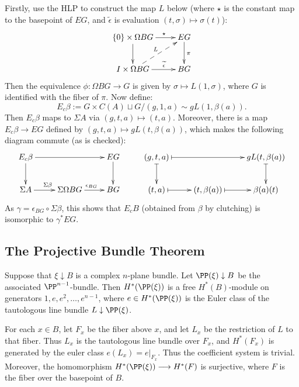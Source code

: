 \documentclass[11pt]{article}
\newcommand{\myheading}[1]
{{\noindent\Large #1}

}
\renewcommand{\myheading}[1]{\subsection{#1}}
\begin{document}
Firstly, use the HLP to construct the map $L$ below (where $\star$ is the constant map to the basepoint of $EG$, and $\widetilde\epsilon$ is evaluation $(t,\sigma)\mapsto \sigma(t)$):
\[\xymatrix{
\{0\}\times\Omega BG\ar[r]^{\ \ \ \ \star}\ar[d]&EG\ar[d]^{\pi}\\
I\times\Omega BG\ar[r]^{\ \ \ \ \widetilde\epsilon}\ar@{-->}[ru]^L&BG
}\]
Then the equivalence $\phi:\Omega BG\to G$ is given by $\sigma\mapsto L(1,\sigma)$, where $G$ is identified with the fiber of $\pi$. Now define:
\[E_c\beta:=G\times C(A)\sqcup G / (g,1,a)\sim gL(1,\beta(a)).\]
Then $E_c\beta$ maps to $\Sigma A$ via $(g,t,a)\mapsto(t,a)$. Moreover, there is a map $E_c\beta\to EG$ defined by $(g,t,a)\mapsto gL(t,\beta(a))$, which makes the following diagram commute (as is checked): 
\[\xymatrix{
E_c\beta\ar[rr]\ar[d]&&EG\ar[d]&
(g,t,a)\ar@{|->}[rr]\ar@{|->}[d]&&gL(t,\beta(a))\ar@{|->}[d]\\
\Sigma A\ar[r]^{\Sigma\beta}&\Sigma\Omega BG\ar[r]^{\epsilon_{BG}}&BG&
(t,a)\ar@{|->}[r]&(t,\beta(a))\ar@{|->}[r]&\beta(a)(t)
}\]
As $\gamma=\epsilon_{BG}\circ\Sigma\beta$, this shows that $E_cB$ (obtained from $\beta$ by clutching) is isomorphic to $\gamma^*EG$.


\myheading{The Projective Bundle Theorem}
Suppose that $\xi\downarrow B$ is a complex $n$-plane bundle. Let $\PP(\xi)\downarrow B$ be the associated $\PP^{n-1}$-bundle. Then $H^*(\PP(\xi))$ is a free $H^*(B)$-module on generators $1,e,e^2,\ldots,e^{n-1}$, where $e\in H^*(\PP(\xi))$ is the Euler class of the tautologous line bundle $L\downarrow \PP(\xi)$.

For each $x\in B$, let $F_x$ be the fiber above $x$, and let $L_x$ be the restriction of $L$ to that fiber. Thus $L_x$ is the tautologous line bundle over $F_x$, and $H^*(F_x)$ is generated by the euler class $e(L_x)=e|_{F_x}$. Thus the coefficient system is trivial. Moreover, the homomorphism $H^*(\PP(\xi))\to H^*(F)$ is surjective, where $F$ is the fiber over the basepoint of $B$.
\end{document}

